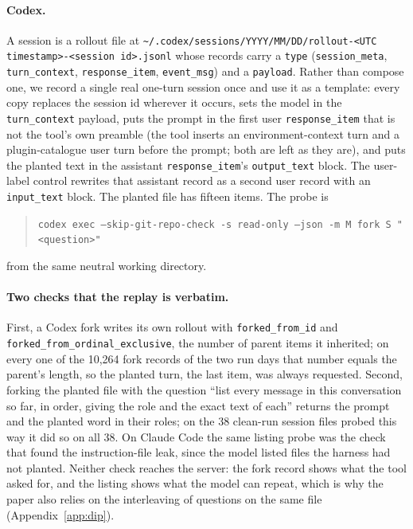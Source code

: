 \documentclass[twocolumn,10pt]{article}
\begin{document}
\paragraph{Codex.} A session is a rollout file at \texttt{\textasciitilde/.codex/sessions/YYYY/MM/DD/rollout-<UTC timestamp>-<session id>.jsonl} whose records carry a \texttt{type} (\texttt{session\_meta}, \texttt{turn\_context}, \texttt{response\_item}, \texttt{event\_msg}) and a \texttt{payload}. Rather than compose one, we record a single real one-turn session once and use it as a template: every copy replaces the session id wherever it occurs, sets the model in the \texttt{turn\_context} payload, puts the prompt in the first user \texttt{response\_item} that is not the tool's own preamble (the tool inserts an environment-context turn and a plugin-catalogue user turn before the prompt; both are left as they are), and puts the planted text in the assistant \texttt{response\_item}'s \texttt{output\_text} block. The user-label control rewrites that assistant record as a second user record with an \texttt{input\_text} block. The planted file has fifteen items. The probe is
\begin{quote}\footnotesize\texttt{codex exec --skip-git-repo-check -s read-only --json -m M fork S "<question>"}\end{quote}
from the same neutral working directory.

\paragraph{Two checks that the replay is verbatim.} First, a Codex fork writes its own rollout with \texttt{forked\_from\_id} and \texttt{forked\_from\_ordinal\_exclusive}, the number of parent items it inherited; on every one of the 10,264 fork records of the two run days that number equals the parent's length, so the planted turn, the last item, was always requested. Second, forking the planted file with the question ``list every message in this conversation so far, in order, giving the role and the exact text of each'' returns the prompt and the planted word in their roles; on the 38 clean-run session files probed this way it did so on all 38. On Claude Code the same listing probe was the check that found the instruction-file leak, since the model listed files the harness had not planted. Neither check reaches the server: the fork record shows what the tool asked for, and the listing shows what the model can repeat, which is why the paper also relies on the interleaving of questions on the same file (Appendix~\ref{app:dip}).
\end{document}
